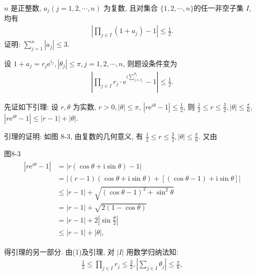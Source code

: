 \begin{example}
	$n$ 是正整数, $a_j(j=1,2, \cdots, n)$ 为复数, 且对集合 $\{1,2, \cdots, n\}$的任一非空子集 $I$, 均有
	\begin{align*}
		\left|\prod_{j \in I}\left(1+a_j\right)-1\right| \leqslant \frac{1}{2} .
	\end{align*}
	证明: $\sum_{j=1}^n\left|a_j\right| \leqslant 3$.
\end{example}
\begin{solution}
	设 $1+a_j=r_j \mathrm{e}^{i_j},\left|\theta_j\right| \leqslant \pi, j=1,2, \cdots, n$, 则题设条件变为
	\begin{align*}
		\left|\prod_{j \in I} r_j \cdot \mathrm{e}^{i \sum_{j \in I_j}^{\theta_j}}-1\right| \leqslant \frac{1}{2} .
	\end{align*}

	先证如下引理: 设 $r, \theta$ 为实数, $r>0,|\theta| \leqslant \pi$, $\left|r \mathrm{e}^{i \theta}-1\right| \leqslant \frac{1}{2}$, 则 $\frac{1}{2} \leqslant r \leqslant \frac{3}{2},|\theta| \leqslant \frac{\pi}{6}$, $\left|r \mathrm{e}^{i \theta}-1\right| \leqslant|r-1|+|\theta|$.

	引理的证明: 如图 8-3, 由复数的几何意义, 有 $\frac{1}{2} \leqslant r \leqslant \frac{3}{2},|\theta| \leqslant \frac{\pi}{6}$.
	又由

	图8-3
	\begin{align*}
		\begin{aligned}
			\left|r \mathrm{e}^{i \theta}-1\right| & =|r(\cos \theta+\mathrm{i} \sin \theta)-1|                                            \\
			                                       & =|(r-1)(\cos \theta+\mathrm{i} \sin \theta)+[(\cos \theta-1)+\mathrm{i} \sin \theta]| \\
			                                       & \leqslant|r-1|+\sqrt{(\cos \theta-1)^2+\sin ^2 \theta}                                \\
			                                       & =|r-1|+\sqrt{2(1-\cos \theta)}                                                        \\
			                                       & =|r-1|+2\left|\sin \frac{\theta}{2}\right|                                            \\
			                                       & \leqslant|r-1|+|\theta|,
		\end{aligned}
	\end{align*}

	得引理的另一部分.
	由(1)及引理, 对 $|I|$ 用数学归纳法知:
	\begin{align*}
		\frac{1}{2} \leqslant \prod_{j \in I} r_j \leqslant \frac{3}{2},\left|\sum_{j \in I} \theta_j\right| \leqslant \frac{\pi}{6},
	\end{align*}


\end{solution}
